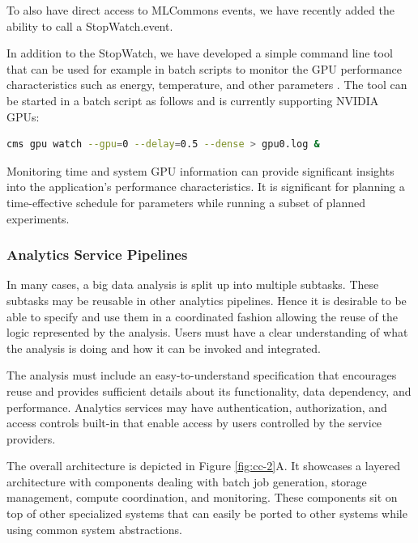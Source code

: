 To also have direct access to MLCommons events, we have recently added the ability to call a StopWatch.event.


In addition to the StopWatch, we have developed a simple command line tool that can be used for example in batch scripts to monitor the GPU performance characteristics such as energy, temperature, and other parameters \citep{cloudmesh-gpu}. The tool can be started in a batch script as follows and is currently supporting NVIDIA GPUs:


\begin{lstlisting}[language=sh]
    cms gpu watch --gpu=0 --delay=0.5 --dense > gpu0.log &
\end{lstlisting}


Monitoring time and system GPU information can provide significant insights into the application's performance characteristics. It is significant for planning a time-effective schedule for parameters while running a subset of planned experiments.


\subsubsection{Analytics Service Pipelines}

In many cases, a big data analysis is split up into multiple subtasks. These subtasks may be reusable in other analytics pipelines. Hence it is desirable to be able to specify and use them in a coordinated fashion allowing the reuse of the logic represented by the analysis. Users must have a clear understanding of what the analysis is doing and how it can be invoked and integrated.

The analysis must include an easy-to-understand specification that encourages reuse and provides sufficient details about its functionality, data dependency, and performance. Analytics services may have authentication, authorization, and access controls built-in that enable access by users controlled by the service providers.

The overall architecture is depicted in Figure \ref{fig:cc-2}A. It showcases a layered architecture with components dealing with batch job generation, storage management, compute coordination, and monitoring. These components sit on top of other specialized systems that can easily be ported to other systems while using common system abstractions.



